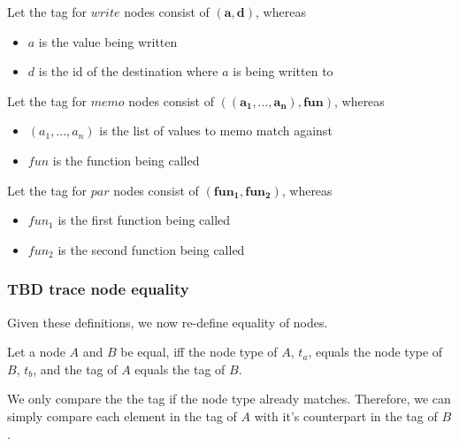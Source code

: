 \begin{definition}
Let the tag for $write$ nodes consist of $\mathbf{(a, d)}$, whereas
\begin{itemize}
\item $a$ is the value being written
\item $d$ is the id of the destination where $a$ is being written to 
\end{itemize}
\end{definition}

\begin{definition}
Let the tag for $memo$ nodes consist of $\mathbf{((a_1, ..., a_n), fun)}$, whereas
\begin{itemize}
\item $(a_1, ..., a_n)$ is the list of values to memo match against
\item $fun$ is the function being called
\end{itemize}
\end{definition}

\begin{definition}
Let the tag for $par$ nodes consist of $\mathbf{(fun_1, fun_2)}$, whereas
\begin{itemize}
\item $fun_1$ is the first function being called
\item $fun_2$ is the second function being called
\end{itemize}
\end{definition}

\subsubsection{TBD trace node equality}
\label{sec:node_equality}
Given these definitions, we now re-define equality of nodes. 

\begin{definition}
Let a node $A$ and $B$ be equal, iff the node type of $A$, $t_a$, equals the node type of $B$, $t_b$, and the tag of $A$ equals the tag of $B$. 
\end{definition}
We only compare the the tag if the node type already matches. Therefore, we can simply compare each element in the tag of $A$ with it's counterpart in the tag of $B$. 

